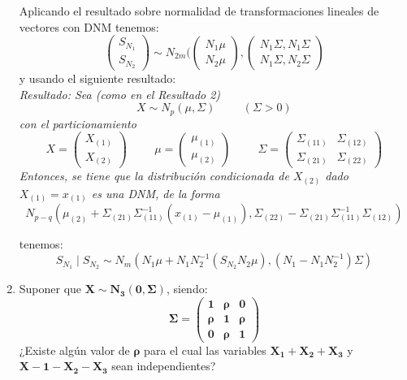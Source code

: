 \documentclass[11pt,a4paper]{article}
\begin{document}
\begin{enumerate}[label=\arabic*.]
Aplicando el resultado sobre normalidad de transformaciones lineales de vectores con DNM tenemos:
$$\begin{pmatrix}
S_{N_{1}} \\
S_{N_{2}}
\end{pmatrix} \sim N_{2m}(\begin{pmatrix}
N_{1}\mu \\
N_{2}\mu
\end{pmatrix}, \begin{pmatrix}
N_{1}\Sigma, N_{1}\Sigma \\
N_{1}\Sigma, N_{2}\Sigma
\end{pmatrix}$$
y usando el siguiente resultado: \\
\itshape
Resultado: Sea (como en el Resultado 2)
$$X \sim N_{p}(\mu, \Sigma) \hspace{1cm} (\Sigma > 0)$$
con el particionamiento
$$X = \begin{pmatrix} X_{(1)} \\ X_{(2)} \end{pmatrix} \hspace{1cm} \mu = \begin{pmatrix} \mu_{(1)} \\ \mu_{(2)} \end{pmatrix} \hspace{1cm} \Sigma = \begin{pmatrix}
\Sigma_{(11)} & \Sigma_{(12)} \\
\Sigma_{(21)} & \Sigma_{(22)}
\end{pmatrix}$$
Entonces, se tiene que la distribución condicionada de $X_{(2)}$ dado $X_{(1)} = x_{(1)}$ es una DNM, de la forma
$$N_{p-q}(\mu_{(2)} + \Sigma_{(21)}\Sigma_{(11)}^{-1}(x_{(1)} - \mu_{(1)}), \Sigma_{(22)} - \Sigma_{(21)}\Sigma_{(11)}^{-1}\Sigma_{(12)})$$
\normalfont

tenemos:
$$S_{N_{1}} \mid S_{N_{2}} \sim N_{m}(N_{1}\mu + N_{1}N_{2}^{-1}(S_{N_{2}} N_{2}\mu), (N_{1} - N_{1}N_{2}^{-1})\Sigma)$$

\newpage
\bfseries
\item Suponer que $\mathbf{X \sim N_{3}(0, \Sigma)}$, siendo:
$$\mathbf{\Sigma = \begin{pmatrix}
\mathbf{1} & \mathbf{\rho} & \mathbf{0} \\
\mathbf{\rho} & \mathbf{1} & \mathbf{\rho} \\
\mathbf{0} & \mathbf{\rho} & \mathbf{1}
\end{pmatrix}}$$
¿Existe algún valor de $\mathbf{\rho}$ para el cual las variables $\mathbf{X_{1} + X_{2} + X_{3}}$ y $\mathbf{X-{1}-X_{2}-X_{3}}$ sean independientes?
\end{enumerate}
\vspace{0.5cm}
\normalfont
\end{document}
